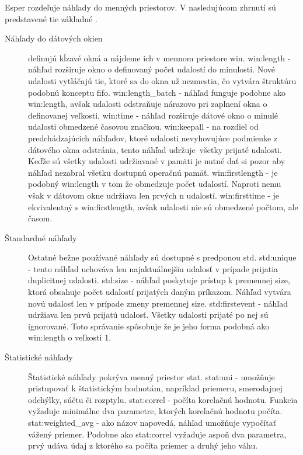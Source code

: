 		Esper rozdeľuje náhľady do menných priestorov. V nasledujúcom zhrnutí sú predstavené tie základné \cite{web:esper-doc}.
		\begin{description}
			\item[Náhľady do dátových okien] definujú kĺzavé okná a nájdeme ich v mennom priestore win.
				\subitem win:length - náhľad rozširuje okno o definovaný počet udalostí do minulosti. Nové udalosti vytláčajú tie, ktoré sa do okna už nezmestia, čo vytvára štruktúru podobnú konceptu fifo.
				\subitem win:length\_batch - náhľad funguje podobne ako win:length, avšak udalosti odstraňuje nárazovo pri zaplnení okna o definovanej veľkosti.
				\subitem win:time - náhľad rozširuje dátové okno o minulé udalosti obmedzené časovou značkou.
				\subitem win:keepall - na rozdiel od predchádzajúcich náhľadov, ktoré udalosti nevyhovujúce podmienke z dátového okna odstránia, tento náhľad udržuje\ všetky prijaté udalosti. Keďže sú všetky udalosti udržiavané v pamäti je nutné dať si pozor aby náhľad nezabral všetku dostupnú operačnú pamäť.
				\subitem win:firstlength - je podobný win:length v tom že obmedzuje počet udalostí. Naproti nemu však v dátovom okne udržiava len prvých n udalostí.
				\subitem win:firsttime - je ekvivalentný s win:firstlength, avšak udalosti nie sú obmedzené počtom, ale časom.

			\item[Štandardné náhľady] Ostatné bežne používané náhľady sú dostupné s predponou std.
				\subitem std:unique - tento náhľad uchováva len najaktuálnejšiu udalosť v prípade prijatia duplicitnej udalosti.
				\subitem std:size - náhľad poskytuje prístup k premennej size, ktorá obsahuje počet udalostí prijatých daným príkazom. Náhľad vytvára novú udalosť len v prípade zmeny premennej size. 
				\subitem std:firstevent - náhľad udržiava len prvú prijatú udalosť. Všetky udalosti prijaté po nej sú ignorované. Toto správanie spôsobuje že je jeho forma podobná ako win:length o veľkosti 1.

			\item[Štatistické náhľady] Štatistické náhľady pokrýva menný priestor stat.
				\subitem stat:uni - umožňuje pristupovať k štatistickým hodnotám, napríklad priemeru, smerodajnej odchýlky, súčtu či rozptylu.
				\subitem stat:correl - počíta korelačnú hodnotu. Funkcia vyžaduje minimálne dva parametre, ktorých korelačnú hodnotu počíta.
				\subitem stat:weighted\_avg - ako názov napovedá, náhľad umožňuje vypočítať vážený priemer. Podobne ako stat:correl vyžaduje aspoň dva parametra, prvý udáva údaj z ktorého sa počíta priemer a druhý jeho váhu.
		\end{description}
		
